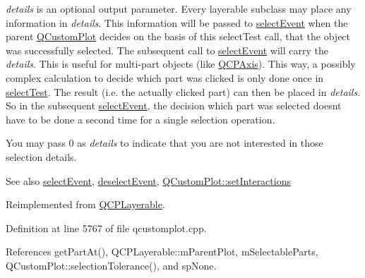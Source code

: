 {\itshape details} is an optional output parameter. Every layerable subclass may place any information in {\itshape details}. This information will be passed to \hyperlink{class_q_c_p_axis_aa8a5fe80e2898ec08ada26b5fbee9eca}{select\+Event} when the parent \hyperlink{class_q_custom_plot}{Q\+Custom\+Plot} decides on the basis of this select\+Test call, that the object was successfully selected. The subsequent call to \hyperlink{class_q_c_p_axis_aa8a5fe80e2898ec08ada26b5fbee9eca}{select\+Event} will carry the {\itshape details}. This is useful for multi-\/part objects (like \hyperlink{class_q_c_p_axis}{Q\+C\+P\+Axis}). This way, a possibly complex calculation to decide which part was clicked is only done once in \hyperlink{class_q_c_p_axis_a2877a6230920c118be65c6113089f467}{select\+Test}. The result (i.\+e. the actually clicked part) can then be placed in {\itshape details}. So in the subsequent \hyperlink{class_q_c_p_axis_aa8a5fe80e2898ec08ada26b5fbee9eca}{select\+Event}, the decision which part was selected doesn\textquotesingle{}t have to be done a second time for a single selection operation.

You may pass 0 as {\itshape details} to indicate that you are not interested in those selection details.

\begin{DoxySeeAlso}{See also}
\hyperlink{class_q_c_p_axis_aa8a5fe80e2898ec08ada26b5fbee9eca}{select\+Event}, \hyperlink{class_q_c_p_axis_a53512242cde6ec21943a3ba10dbf78c3}{deselect\+Event}, \hyperlink{class_q_custom_plot_a5ee1e2f6ae27419deca53e75907c27e5}{Q\+Custom\+Plot\+::set\+Interactions} 
\end{DoxySeeAlso}


Reimplemented from \hyperlink{class_q_c_p_layerable_a4001c4d0dfec55598efa4d531f2179a9}{Q\+C\+P\+Layerable}.



Definition at line 5767 of file qcustomplot.\+cpp.



References get\+Part\+At(), Q\+C\+P\+Layerable\+::m\+Parent\+Plot, m\+Selectable\+Parts, Q\+Custom\+Plot\+::selection\+Tolerance(), and sp\+None.


